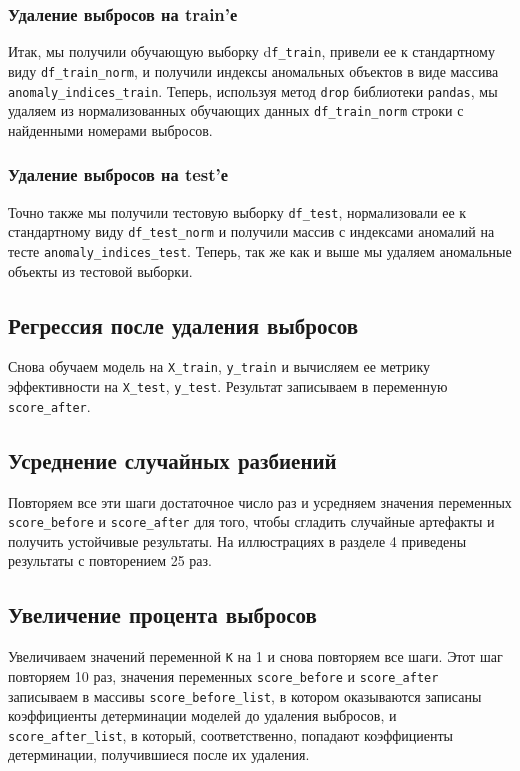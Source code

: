 \documentclass[a4paper,12pt]{article}
\begin{document}
\subsubsection{Удаление выбросов на train'е} 

Итак, мы получили обучающую выборку d\texttt{f\_train}, привели ее к стандартному виду \texttt{df\_train\_norm}, и получили индексы аномальных объектов в виде массива \texttt{anomaly\_indices\_train}. Теперь, используя метод \texttt{drop} библиотеки \texttt{pandas}, мы удаляем из нормализованных обучающих данных \texttt{df\_train\_norm} строки с найденными номерами выбросов.

\subsubsection{Удаление выбросов на test'е} 

Точно также мы получили тестовую выборку \texttt{df\_test}, нормализовали ее к стандартному виду \texttt{df\_test\_norm} и получили  массив с индексами аномалий на тесте \texttt{anomaly\_indices\_test}. Теперь, так же как и выше мы удаляем аномальные объекты из тестовой выборки.

\subsection{Регрессия после удаления выбросов}

Снова обучаем модель на \texttt{X\_train}, \texttt{y\_train} и вычисляем ее метрику эффективности на \texttt{X\_test}, \texttt{y\_test}. Результат записываем в переменную \texttt{score\_after}.


\subsection{Усреднение  случайных разбиений}


Повторяем все эти шаги достаточное число раз и усредняем значения переменных \texttt{score\_before} и \texttt{score\_after} для того, чтобы сгладить случайные артефакты и получить устойчивые результаты. На иллюстрациях в разделе 4 приведены результаты с повторением 25 раз.

\subsection{Увеличение процента выбросов}
Увеличиваем значений переменной \texttt{K} на 1 и снова повторяем все шаги. Этот шаг повторяем 10 раз, значения переменных \texttt{score\_before} и \texttt{score\_after} записываем в массивы \texttt{score\_before\_list}, в котором оказываются записаны коэффициенты детерминации моделей до удаления выбросов, и \texttt{score\_after\_list}, в который, соответственно, попадают коэффициенты детерминации, получившиеся после их удаления.
\end{document}

